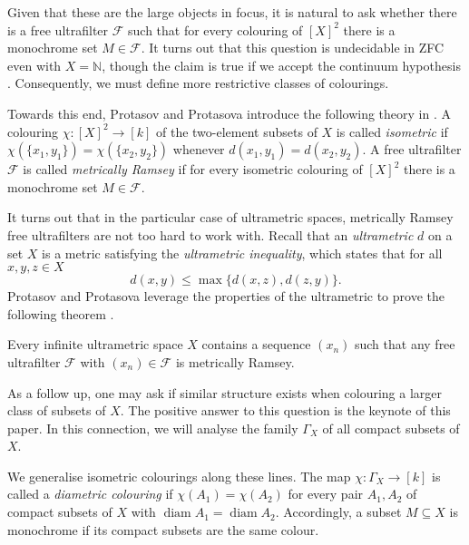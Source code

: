 Given that these are the large objects in focus, it is natural to ask whether there is a free ultrafilter \( \mathcal{F} \) such that for every colouring of \( [X]^{2} \) there is a monochrome set \( M \in \mathcal{F} \). It turns out that this question is undecidable in ZFC even with \( X = \mathbb{N} \), though the claim is true if we accept the continuum hypothesis \cite{protasov:2017}. Consequently, we must define more restrictive classes of colourings.

Towards this end, Protasov and Protasova introduce the following theory in \cite{protasov:2017}. A colouring \( \chi : [X]^{2} \to [k] \) of the two-element subsets of \( X \) is called \emph{isometric} if \( \chi (\{ x_1, y_1 \} ) = \chi (\{ x_2, y_2 \} ) \) whenever \( d(x_1, y_1) = d(x_2, y_2) \). A free ultrafilter \( \mathcal{F} \) is called \emph{metrically Ramsey} if for every isometric colouring of \( [X]^{2} \) there is a monochrome set \( M \in \mathcal{F} \).

It turns out that in the particular case of ultrametric spaces, metrically Ramsey free ultrafilters are not too hard to work with. Recall that an \emph{ultrametric} \( d \) on a set \( X \) is a metric satisfying the \emph{ultrametric inequality}, which states that for all \( x,y,z \in X \) \[ d(x,y) \leq \max \{ d(x,z), d(z,y) \}. \] Protasov and Protasova leverage the properties of the ultrametric to prove the following theorem \cite{protasov:2017}.

\begin{theorem}
\label{thm:1}
Every infinite ultrametric space \( X \) contains a sequence \( (x_{n}) \) such that any free ultrafilter \( \mathcal{F} \) with \( (x_{n}) \in \mathcal{F} \) is metrically Ramsey.
\end{theorem}

As a follow up, one may ask if similar structure exists when colouring a larger class of subsets of \( X \). The positive answer to this question is the keynote of this paper. In this connection, we will analyse the family \( \Gamma_{X} \) of all compact subsets of \( X \).

We generalise isometric colourings along these lines. The map \( \chi : \Gamma_{X} \to [k] \) is called a \emph{diametric colouring} if \( \chi (A_1) = \chi (A_2) \) for every pair \( A_1, A_2 \) of compact subsets of \( X \) with \( \operatorname{diam} A_1 = \operatorname{diam} A_2 \). Accordingly, a subset \( M \subseteq X \) is monochrome if its compact subsets are the same colour. 

